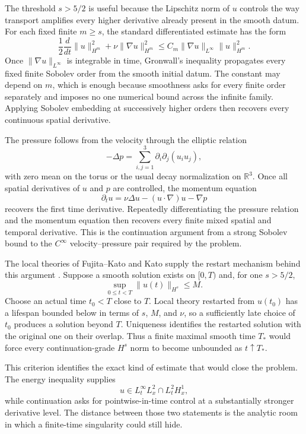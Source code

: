 The threshold \(s>5/2\) is useful because the Lipschitz norm of \(u\) controls the way transport amplifies every higher derivative already present in the smooth datum.
For each fixed finite \(m\geq s\), the standard differentiated estimate has the form
\[
  \frac12\frac{d}{dt}\lVert u\rVert_{H^m}^{2}
  +\nu\lVert\nabla u\rVert_{H^m}^{2}
  \leq
  C_m\lVert\nabla u\rVert_{L^\infty}\lVert u\rVert_{H^m}^{2}.
\]
Once \(\lVert\nabla u\rVert_{L^\infty}\) is integrable in time, Gronwall's inequality propagates every fixed finite Sobolev order from the smooth initial datum.
The constant may depend on \(m\), which is enough because smoothness asks for every finite order separately and imposes no one numerical bound across the infinite family.
Applying Sobolev embedding at successively higher orders then recovers every continuous spatial derivative.

The pressure follows from the velocity through the elliptic relation
\[
  -\Delta p
  =
  \sum_{i,j=1}^{3}\partial_i\partial_j(u_i u_j),
\]
with zero mean on the torus or the usual decay normalization on \(\mathbb R^3\).
Once all spatial derivatives of \(u\) and \(p\) are controlled, the momentum equation
\[
  \partial_tu
  =
  \nu\Delta u-(u\cdot\nabla)u-\nabla p
\]
recovers the first time derivative.
Repeatedly differentiating the pressure relation and the momentum equation then recovers every finite mixed spatial and temporal derivative.
This is the continuation argument from a strong Sobolev bound to the \(C^\infty\) velocity--pressure pair required by the problem.

The local theories of Fujita--Kato and Kato supply the restart mechanism behind this argument \parencite{FujitaKato1964,Kato1984}.
Suppose a smooth solution exists on \([0,T)\) and, for one \(s>5/2\),
\[
  \sup_{0\leq t<T}\lVert u(t)\rVert_{H^s}\leq M.
\]
Choose an actual time \(t_0<T\) close to \(T\).
Local theory restarted from \(u(t_0)\) has a lifespan bounded below in terms of \(s\), \(M\), and \(\nu\), so a sufficiently late choice of \(t_0\) produces a solution beyond \(T\).
Uniqueness identifies the restarted solution with the original one on their overlap.
Thus a finite maximal smooth time \(T_*\) would force every continuation-grade \(H^s\) norm to become unbounded as \(t\uparrow T_*\).

This criterion identifies the exact kind of estimate that would close the problem.
The energy inequality supplies
\[
  u\in L^\infty_tL^2_x\cap L^2_tH^1_x,
\]
while continuation asks for pointwise-in-time control at a substantially stronger derivative level.
The distance between those two statements is the analytic room in which a finite-time singularity could still hide.

